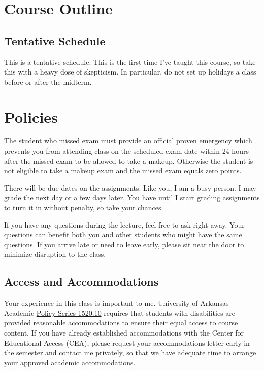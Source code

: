 \documentclass[12pt]{article}
\begin{document}
\section*{Course Outline}

\subsection*{Tentative Schedule}

This is a tentative schedule. This is the first time I've taught this course, so take this with a heavy dose of skepticism. In particular, do not set up holidays a class before or after the midterm. 

\begin{landscape}
  
\end{landscape}







\section*{Policies}

The student who missed exam must provide an official proven emergency which prevents you from attending class on the scheduled exam date within 24 hours after the missed exam to be allowed to take a makeup. Otherwise the student is not eligible to take a makeup exam and the missed exam equals zero points.

There will be due dates on the assignments. Like you, I am a busy person. I may grade the next day or a few days later. You have until I start grading assignments to turn it in without penalty, so take your chances. 

If you have any questions during the lecture, feel free to ask right away. Your questions can benefit both you and other students who might have the same questions. If you arrive late or need to leave early, please sit near the door to minimize disruption to the class.

\subsection*{Access and Accommodations}

Your experience in this class is important to me. University of Arkansas Academic \href{https://policies.uark.edu/academic/152010.php}{Policy Series 1520.10} requires that students with disabilities are provided reasonable accommodations to ensure their equal access to course content. If you have already established accommodations with the Center for Educational Access (CEA), please request your accommodations letter early in the semester and contact me privately, so that we have adequate time to arrange your approved academic accommodations.
\end{document}
